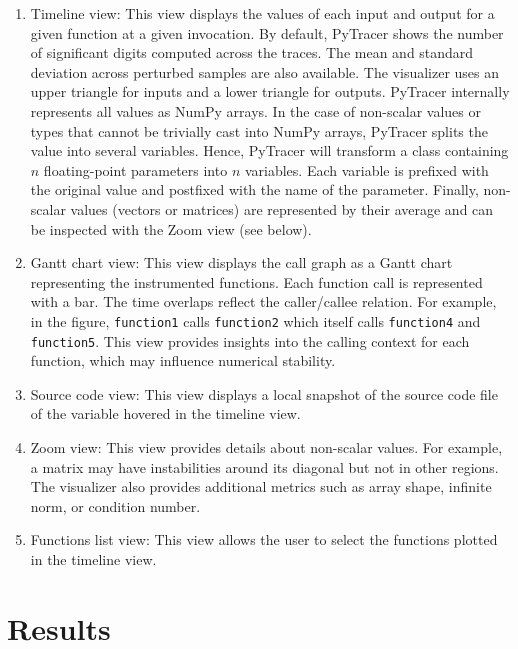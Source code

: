 \documentclass[10pt,journal,compsoc]{IEEEtran}
\newcommand{\pytracer}[0]{PyTracer\xspace}
\begin{document}
\begin{enumerate}
    \item Timeline view: This view displays the values of each input and output
          for a given function at a given invocation. By default, \pytracer
          shows the number of significant digits computed across the traces. The
          mean and standard deviation across perturbed samples are also
          available. The visualizer uses an upper triangle for inputs and a
          lower triangle for outputs. \pytracer internally represents all values
          as NumPy arrays. In the case of non-scalar values or types that cannot
          be trivially cast into NumPy arrays, \pytracer splits the value into
          several variables. Hence, \pytracer will transform a class containing
          $n$ floating-point parameters into $n$ variables. Each variable is
          prefixed with the original value and postfixed with the name of the
          parameter. Finally, non-scalar values (vectors or matrices) are
          represented by their average and can be inspected with the Zoom view
          (see below).
    \item Gantt chart view: This view displays the call graph as a Gantt chart
          representing the instrumented functions. Each function call is
          represented with a bar. The time overlaps reflect the caller/callee
          relation. For example, in the figure, \texttt{function1} calls
          \texttt{function2} which itself calls \texttt{function4} and
          \texttt{function5}. This view provides insights into the calling context
          for each function, which may influence numerical stability.
    \item  Source code view: This view displays a local snapshot of the source
          code file of the variable hovered in the timeline view.
    \item Zoom view: This view provides details about non-scalar values. For
          example, a matrix may have instabilities around its diagonal but not
          in other regions. The visualizer also provides additional metrics such
          as array shape, infinite norm, or condition number.
    \item  Functions list view: This view allows the user to select the
          functions plotted in the timeline view.
\end{enumerate}

\section{Results}
\end{document}
